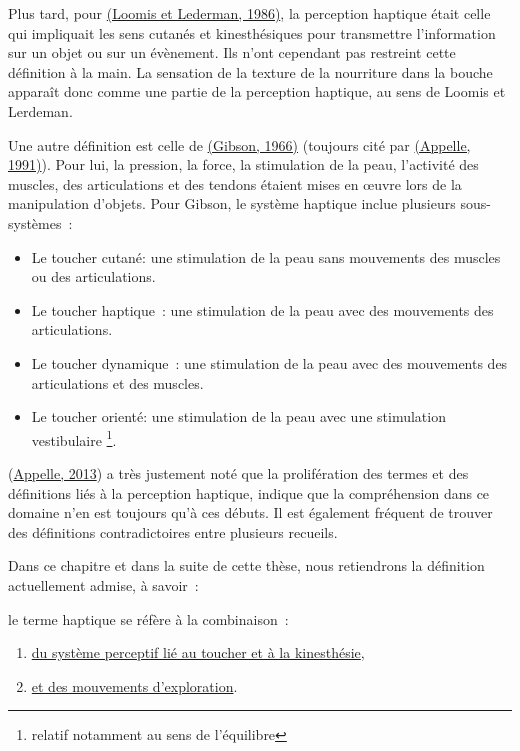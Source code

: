 \documentclass[
]{book}
\providecommand{\tightlist}{%
  \setlength{\itemsep}{0pt}\setlength{\parskip}{0pt}}
\begin{document}
Plus tard, pour \href{047-bibliographie.html\#Loomis1986}{(Loomis et Lederman,
1986)}, la perception haptique était celle qui impliquait les sens cutanés
et kinesthésiques pour transmettre l'information sur un objet ou sur un
évènement. Ils n'ont cependant pas restreint cette définition à la main. La
sensation de la texture de la nourriture dans la bouche apparaît donc comme
une partie de la perception haptique, au sens de Loomis et Lerdeman.

Une autre définition est celle de \href{047-bibliographie.html\#Gibson1966}{(Gibson,
1966)} (toujours cité par \href{047-bibliographie.html\#Appelle1991}{(Appelle,
1991)}). Pour lui, la pression, la force, la stimulation de la peau,
l'activité des muscles, des articulations et des tendons étaient mises en
œuvre lors de la manipulation d'objets. Pour Gibson, le système haptique
inclue plusieurs sous-systèmes~:

\begin{itemize}
\tightlist
\item
  Le toucher cutané: une stimulation de la peau sans
  mouvements des muscles ou des articulations.
\item
  Le toucher haptique~: une stimulation de la peau avec
  des mouvements des articulations.
\item
  Le toucher dynamique~: une stimulation de la peau
  avec des mouvements des articulations et des muscles.
\item
  Le toucher orienté: une stimulation de la peau avec
  une stimulation vestibulaire \footnote{relatif notamment au sens de l'équilibre}.
\end{itemize}

(\protect\hyperlink{ref-appelle2013haptic}{Appelle, 2013}) a très justement noté
que la prolifération des termes et des définitions liés à la perception
haptique, indique que la compréhension dans ce domaine n'en est toujours qu'à
ces débuts. Il est également fréquent de trouver des définitions
contradictoires entre plusieurs recueils.

Dans ce chapitre et dans la suite de cette thèse, nous retiendrons la
définition actuellement admise, à savoir~:

le terme haptique
se réfère à la combinaison~:

\begin{enumerate}
\def\labelenumi{\arabic{enumi}.}
\tightlist
\item
  \protect\hyperlink{somesthesie}{du système perceptif lié au toucher et à la
  kinesthésie},
\item
  \protect\hyperlink{moteur}{et des mouvements d'exploration}.
\end{enumerate}
\end{document}
